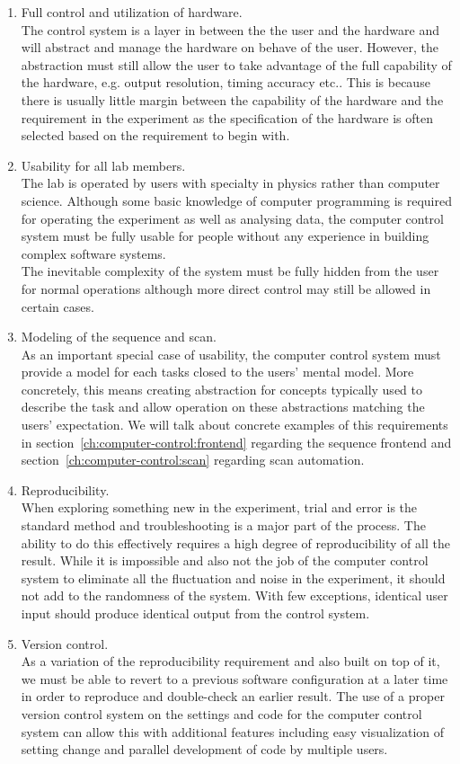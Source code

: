 \begin{enumerate}
\item Full control and utilization of hardware.\\
  The control system is a layer in between the the user and the hardware
  and will abstract and manage the hardware on behave of the user.
  However, the abstraction must still allow the user to take advantage of
  the full capability of the hardware, e.g. output resolution, timing accuracy etc..
  This is because there is usually little margin between the capability of the hardware
  and the requirement in the experiment as the specification of the hardware
  is often selected based on the requirement to begin with.
\item Usability for all lab members.\\
  The lab is operated by users with specialty in physics rather than computer science.
  Although some basic knowledge of computer programming is required for operating
  the experiment as well as analysing data,
  the computer control system must be fully usable for people without any experience
  in building complex software systems.\\
  The inevitable complexity of the system must be fully hidden from the user
  for normal operations although more direct control may still be allowed in certain cases.
\item Modeling of the sequence and scan.\\
  As an important special case of usability,
  the computer control system must provide a model for each tasks closed to
  the users' mental model.
  More concretely, this means creating abstraction for concepts
  typically used to describe the task and allow operation on these abstractions
  matching the users' expectation.
  We will talk about concrete examples of this requirements
  in section~\ref{ch:computer-control:frontend} regarding the sequence frontend
  and section~\ref{ch:computer-control:scan} regarding scan automation.
\item Reproducibility.\\
  When exploring something new in the experiment,
  trial and error is the standard method and troubleshooting is a major part of the process.
  The ability to do this effectively requires a high degree of reproducibility of all the result.
  While it is impossible and also not the job of the computer control system to
  eliminate all the fluctuation and noise in the experiment,
  it should not add to the randomness of the system.
  With few exceptions, identical user input should produce identical output from
  the control system.
\item Version control.\\
  As a variation of the reproducibility requirement and also built on top of it,
  we must be able to revert to a previous software configuration at a later time
  in order to reproduce and double-check an earlier result.
  The use of a proper version control system on the settings and code for
  the computer control system can allow this with additional features
  including easy visualization of setting change and parallel development of code
  by multiple users.
\end{enumerate}

